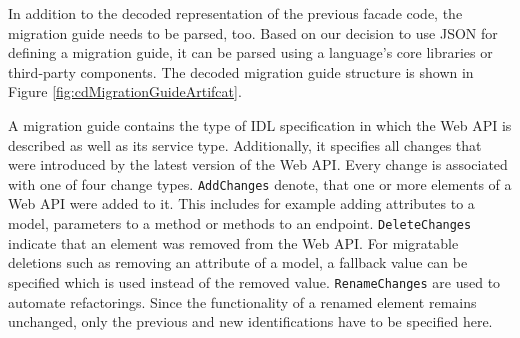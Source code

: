 \begin{figure}[!h]
\end{figure}

In addition to the decoded representation of the previous facade code, the migration guide needs to be parsed, too. Based on our decision to use \ac{JSON} for defining a migration guide, it can be parsed using a language's core libraries or third-party components. The decoded migration guide structure is shown in Figure \ref{fig:cdMigrationGuideArtifcat}. 

A migration guide contains the type of \ac{IDL} specification in which the Web API is described as well as its service type. Additionally, it specifies all changes that were introduced by the latest version of the Web API. Every change is associated with one of four change types. \texttt{Add\-Changes} denote, that one or more elements of a Web API were added to it. This includes for example adding attributes to a model, parameters to a method or methods to an endpoint. \texttt{Delete\-Changes} indicate that an element was removed from the Web API. For migratable deletions such as removing an attribute of a model, a fallback value can be specified which is used instead of the removed value. \texttt{Rename\-Changes} are used to automate refactorings. Since the functionality of a renamed element remains unchanged, only the previous and new identifications have to be specified here. 

